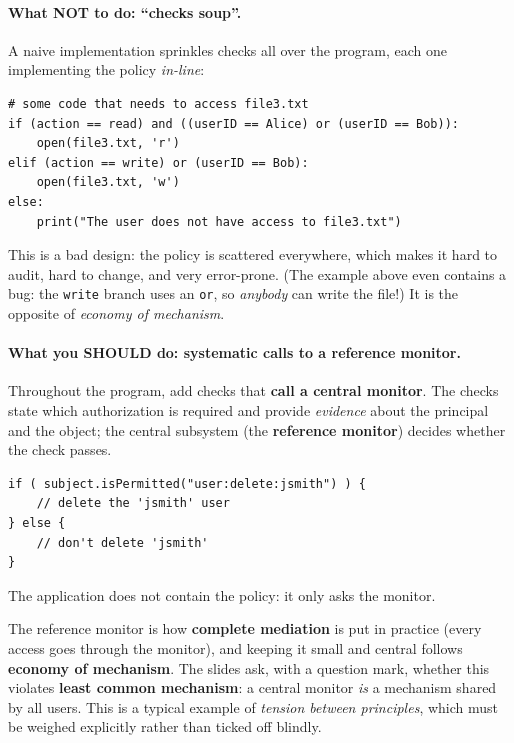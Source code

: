 \paragraph{What NOT to do: ``checks soup''.} A naive implementation sprinkles checks all over the program, each one implementing the policy \emph{in-line}:

\begin{verbatim}
# some code that needs to access file3.txt
if (action == read) and ((userID == Alice) or (userID == Bob)):
    open(file3.txt, 'r')
elif (action == write) or (userID == Bob):
    open(file3.txt, 'w')
else:
    print("The user does not have access to file3.txt")
\end{verbatim}

This is a bad design: the policy is scattered everywhere, which makes it hard to audit, hard to change, and very error-prone. (The example above even contains a bug: the \texttt{write} branch uses an \texttt{or}, so \emph{anybody} can write the file!) It is the opposite of \emph{economy of mechanism}.

\paragraph{What you SHOULD do: systematic calls to a reference monitor.} Throughout the program, add checks that \textbf{call a central monitor}. The checks state which authorization is required and provide \emph{evidence} about the principal and the object; the central subsystem (the \textbf{reference monitor}) decides whether the check passes.

\begin{verbatim}
if ( subject.isPermitted("user:delete:jsmith") ) {
    // delete the 'jsmith' user
} else {
    // don't delete 'jsmith'
}
\end{verbatim}
The application does not contain the policy: it only asks the monitor.

\begin{remark}
The reference monitor is how \textbf{complete mediation} is put in practice (every access goes through the monitor), and keeping it small and central follows \textbf{economy of mechanism}. The slides ask, with a question mark, whether this violates \textbf{least common mechanism}: a central monitor \emph{is} a mechanism shared by all users. This is a typical example of \emph{tension between principles}, which must be weighed explicitly rather than ticked off blindly.
\end{remark}

